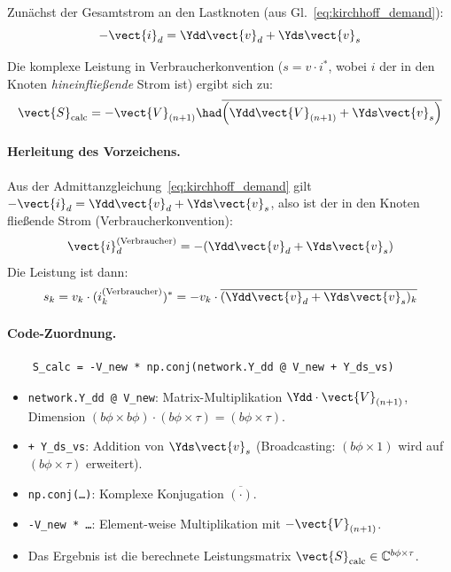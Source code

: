Zunächst der Gesamtstrom an den Lastknoten (aus Gl.~\eqref{eq:kirchhoff_demand}):
\begin{equation}
	-\vect{i}_d = \Ydd \vect{v}_d + \Yds \vect{v}_s
	\label{eq:strom_netz}
\end{equation}

Die komplexe Leistung in Verbraucherkonvention ($s = v \cdot i^*$, wobei $i$ der in den Knoten \textit{hineinfließende} Strom ist) ergibt sich zu:
\begin{equation}
	\vect{S}_{\text{calc}} = -\vect{V}_{(n+1)} \had \overline{\left(\Ydd \vect{V}_{(n+1)} + \Yds \vect{v}_s\right)}
	\label{eq:s_calc}
\end{equation}

\paragraph{Herleitung des Vorzeichens.} Aus der Admittanzgleichung~\eqref{eq:kirchhoff_demand} gilt $-\vect{i}_d = \Ydd \vect{v}_d + \Yds \vect{v}_s$, also ist der in den Knoten fließende Strom (Verbraucherkonvention):
\begin{equation}
	\vect{i}_d^{\text{(Verbraucher)}} = -(\Ydd \vect{v}_d + \Yds \vect{v}_s)
	\label{eq:strom_verbraucher}
\end{equation}
Die Leistung ist dann:
\begin{equation}
	s_k = v_k \cdot (i_k^{\text{(Verbraucher)}})^* = -v_k \cdot \overline{(\Ydd \vect{v}_d + \Yds \vect{v}_s)_k}
	\label{eq:leistung_verbraucher}
\end{equation}

\paragraph{Code-Zuordnung.}
\begin{verbatim}
	S_calc = -V_new * np.conj(network.Y_dd @ V_new + Y_ds_vs)
\end{verbatim}

\begin{itemize}
	\item \texttt{network.Y\_dd @ V\_new}: Matrix-Multiplikation $\Ydd \cdot \vect{V}_{(n+1)}$, Dimension $(b\phi \times b\phi) \cdot (b\phi \times \tau) = (b\phi \times \tau)$.
	\item \texttt{+ Y\_ds\_vs}: Addition von $\Yds \vect{v}_s$ (Broadcasting: $(b\phi \times 1)$ wird auf $(b\phi \times \tau)$ erweitert).
	\item \texttt{np.conj(\ldots)}: Komplexe Konjugation $\overline{(\cdot)}$.
	\item \texttt{-V\_new * \ldots}: Element-weise Multiplikation mit $-\vect{V}_{(n+1)}$.
	\item Das Ergebnis ist die berechnete Leistungsmatrix $\vect{S}_{\text{calc}} \in \mathbb{C}^{b\phi \times \tau}$.
\end{itemize}

